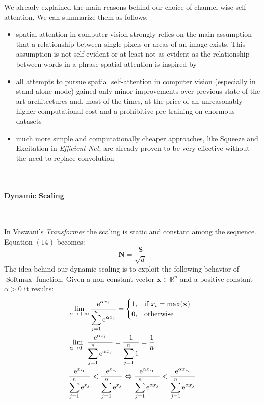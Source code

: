 \documentclass[fleqn,10pt]{SelfArx}
\begin{document}
We already explained the main reasons behind our choice of channel-wise self-attention. We can summarize them as follows:
\begin{itemize}
  \item spatial attention in computer vision strongly relies on the main assumption that a relationship between single pixels or areas of an image exists. This assumption is not self-evident or at least not as evident as the relationship between words in a phrase spatial attention is inspired by
  \item all attempts to pursue spatial self-attention in computer vision (especially in stand-alone mode) gained only minor improvements over previous state of the art architectures and, most of the times, at the price of an unreasonably higher computational cost and a prohibitive pre-training on enormous datasets
  \item much more simple and computationally cheaper approaches, like Squeeze and Excitation in \textit{Efficient Net}, are already proven to be very effective without the need to replace convolution  
\end{itemize}

\

\paragraph{Dynamic Scaling}

\

In Vaswani's \textit{Transformer} the scaling is static and constant among the sequence. Equation $(14)$ becomes:
$$\mathbf{N} = \frac{\mathbf{S}}{\sqrt{d}}$$
The idea behind our dynamic scaling is to exploit the following behavior of $\operatorname{Softmax}$ function. Given a non constant vector $\mathbf{x} \in \mathbb{R}^n$ and a positive constant $\alpha > 0$ it results:
\begin{align}
		   & \lim_{\alpha \to +\infty}\frac{\displaystyle \mathrm{e}^{\alpha x_{i}}}{\displaystyle \sum_{j=1}^{n}\mathrm{e}^{\alpha x_{j}}} = \begin{cases} 1, & \mathrm{if} \hspace{0.1cm} x_{i} = \operatorname{max}(\mathbf{x}) \\ 0, & \mathrm{otherwise} \end{cases} \\
             & \lim_{\alpha \to 0^{+}}\frac{\displaystyle \mathrm{e}^{\alpha x_{i}}}{\displaystyle \sum_{j=1}^{n}\mathrm{e}^{\alpha x_{j}}} = \frac{\displaystyle 1}{\displaystyle \sum_{j=1}^{n}1} = \frac{1}{n}\\
             & \frac{\displaystyle \mathrm{e}^{x_{i_1}}}{\displaystyle \sum_{j=1}^{n}\mathrm{e}^{x_{j}}} < \frac{\displaystyle \mathrm{e}^{x_{i_2}}}{\displaystyle \sum_{j=1}^{n}\mathrm{e}^{x_{j}}} \Leftrightarrow 
                \frac{\displaystyle \mathrm{e}^{\alpha x_{i_1}}}{\displaystyle \sum_{j=1}^{n}\mathrm{e}^{\alpha x_{j}}} < \frac{\displaystyle \mathrm{e}^{\alpha x_{i_2}}}{\displaystyle \sum_{j=1}^{n}\mathrm{e}^{\alpha x_{j}}}
\end{align}
\end{document}
